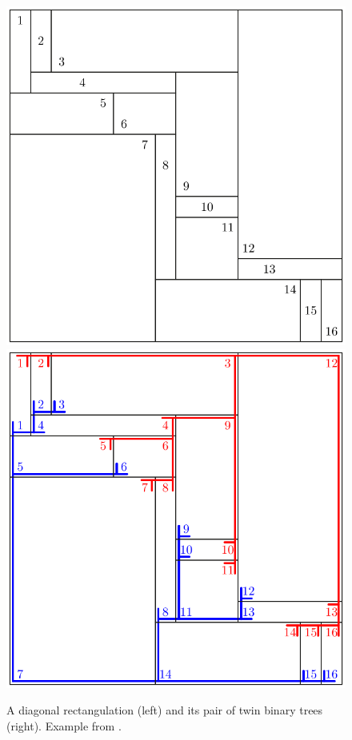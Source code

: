 \documentclass{amsart}
\theoremstyle{definition}
\begin{document}

\begin{figure}
	\centerline{\includegraphics[width=.5\textwidth]{weakRectangulation} \qquad \includegraphics[width=.5\textwidth]{weakRectangulationTrees}}
	\caption{A diagonal rectangulation (left) and its pair of twin binary trees (right). Example from \cite{ACFF24}.}
	\label{fig:weakRectangulation}
\end{figure}
\end{document}
